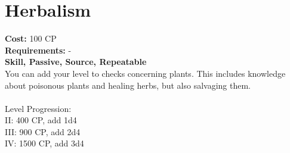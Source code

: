 \section{Herbalism}
\textbf{Cost:} 100 CP\\
\textbf{Requirements:} -\\
\textbf{Skill, Passive, Source, Repeatable}\\
You can add your level to checks concerning plants. This includes knowledge about poisonous plants and healing herbs, but also salvaging them.\\
\\
Level Progression:\\
II: 400 CP, add 1d4\\
III: 900 CP, add 2d4\\
IV: 1500 CP, add 3d4\\
